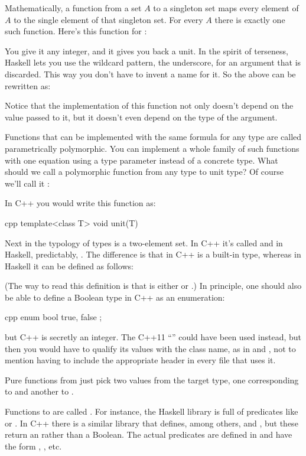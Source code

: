 Mathematically, a function from a set $A$ to a singleton set maps every
element of $A$ to the single element of that singleton set. For every $A$
there is exactly one such function. Here's this function for
:

You give it any integer, and it gives you back a unit. In the spirit of
terseness, Haskell lets you use the wildcard pattern, the underscore,
for an argument that is discarded. This way you don't have to invent a
name for it. So the above can be rewritten as:

Notice that the implementation of this function not only doesn't depend
on the value passed to it, but it doesn't even depend on the type of the
argument.

Functions that can be implemented with the same formula for any type are
called parametrically polymorphic. You can implement a whole family of
such functions with one equation using a type parameter instead of a
concrete type. What should we call a polymorphic function from any type
to unit type? Of course we'll call it :

In C++ you would write this function as:

\begin{snip}{cpp}
template<class T>
void unit(T) {}
\end{snip}
Next in the typology of types is a two-element set. In C++ it's called
 and in Haskell, predictably, . The difference
is that in C++  is a built-in type, whereas in Haskell it
can be defined as follows:

(The way to read this definition is that  is either
 or .) In principle, one should also be able
to define a Boolean type in C++ as an enumeration:

\begin{snip}{cpp}
enum bool { 
    true,
    false
};
\end{snip}
but C++  is secretly an integer. The C++11
``'' could have been used instead, but then you
would have to qualify its values with the class name, as in
 and , not to mention having to
include the appropriate header in every file that uses it.

Pure functions from  just pick two values from the target
type, one corresponding to  and another to .

Functions to  are called . For instance,
the Haskell library  is full of predicates like
 or . In C++ there is a similar library
\code{} that defines, among others,  and
, but these return an  rather than a
Boolean. The actual predicates are defined in  and
have the form , , etc.

